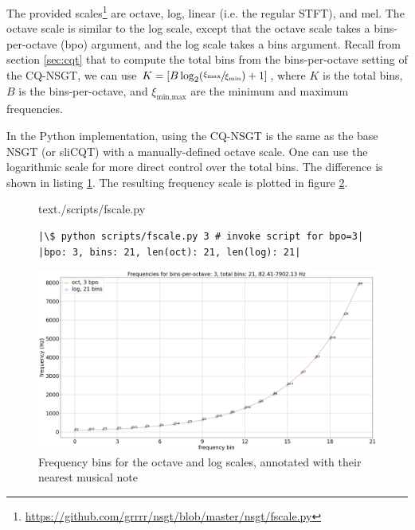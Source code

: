 \documentclass[report.tex]{subfiles}
\begin{document}
The provided scales\footnote{\url{https://github.com/grrrr/nsgt/blob/master/nsgt/fscale.py}} are octave, log, linear (i.e. the regular STFT), and mel. The octave scale is similar to the log scale, except that the octave scale takes a bins-per-octave (bpo) argument, and the log scale takes a bins argument. Recall from section \ref{sec:cqt} that to compute the total bins from the bins-per-octave setting of the CQ-NSGT, we can use $K = [B \log_{2}(\sfrac{\xi_{\text{max}}}{\xi_{\text{min}}}) + 1]$, where $K$ is the total bins, $B$ is the bins-per-octave, and $\xi_{\text{min,max}}$ are the minimum and maximum frequencies.

In the Python implementation, using the CQ-NSGT is the same as the base NSGT (or sliCQT) with a manually-defined octave scale. One can use the logarithmic scale for more direct control over the total bins. The difference is shown in listing \ref{code:octvlog}. The resulting frequency scale is plotted in figure \ref{fig:octvlog}.

\begin{figure}[h]
  \centering
 \begin{minipage}{\textwidth}
  \centering
\setlength\partopsep{-\topsep}
\begin{inputminted}[linenos,breaklines,frame=single,firstline=4,lastline=16,fontsize=\scriptsize]{text}{./scripts/fscale.py}
\end{inputminted}
 \vspace{1em}
 \end{minipage}
 \begin{minipage}{\textwidth}
  \centering
\begin{verbatim}
|\$ python scripts/fscale.py 3 # invoke script for bpo=3|
|bpo: 3, bins: 21, len(oct): 21, len(log): 21|
\end{verbatim}
 \end{minipage}
  \label{code:octvlog}
\end{figure}

\begin{figure}[ht]
	\centering
	\includegraphics[width=\textwidth]{./images-freqscales/log_vs_oct.png}
	\caption{Frequency bins for the octave and log scales, annotated with their nearest musical note}
	\label{fig:octvlog}
\end{figure}
\end{document}
